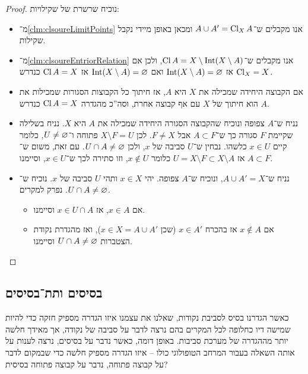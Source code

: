 \documentclass[name=רשימות טופולוגיה כללית]{../../../tex/classes/noChapterMegasumPreamble}
\begin{document}
	\begin{proof}נוכיח שרשרת של שקילויות: 
		\begin{itemize}
			\item[$5\lra3$]מ־\ref{clm:clsoureLimitPoints} אנו מקבלים ש־$A \cup A' = \operatorname{Cl}_X A$ ומכאן באופן מיידי נקבל שקילות. 
			\item[$3\lra4$]מ־\ref{clm:clsoureEntriorRelation} אנו מקבלים ש־$\operatorname{Cl} A = X \setminus \operatorname{Int}(X \setminus A)$, ולכן אם $\operatorname{Cl}_X = X$ אז $\operatorname{Int}(X \setminus A) = \varnothing$ ואם $\operatorname{Int}(X \setminus A) = \varnothing$ אז $\operatorname{Cl} A = X$ כנדרש. 
			\item[$2\to3$]אם הקבוצה היחידה שמכילה את $X$ היא $A$, אז חיתוך כל הקבוצות הסגורות שמכילות את $A$ הוא חיתוך של $X$ עם אף קבוצה אחרת, וסה''כ מהגדרה $\operatorname{Cl} A = X$ כנדרש. 
			\item[$1\to2$]נניח ש־$A$ צפופה ונוכיח שהקבוצה הסגורה היחידה שמכילה את $A$ היא $X$. נניח בשלילה שקיימת $F$ סגורה כך ש־$A \subset F$ אבל $F \neq X$. לכן $X \setminus F = U$ פתוחה ו־$U \neq \varnothing$, כלומר קיים $x \in U$ כלשהו. נבחין ש־$U$ סביבה של $x$, ולכן $U \cap A \neq \varnothing$. עם זאת, משום ש־$A \subset F$ אז $U = X \setminus F \subset X \setminus A$ כלומר $x \notin U$, וזו סתירה לכך ש־$x \in U$, וסיימנו. 
			\item[$5\to1$]נניח ש־$A \cup A' = X$, ונוכיח ש־$A$ צפופה. יהי $x \in X$ ותהי $U$ סביבה של $x$. נוכיח ש־$U \cap A \neq \varnothing$. נפרק למקרים. 
			\begin{itemize}
				\item אם $x \in A$, אז $x \in U \cap A$ וסיימנו. 
				\item אם $x \notin A$ אז בהכרח $x \in A'$ (שכן $x \in X = A \cup A'$), ואז מהגדרת נקודת הצטברות $U \cap A \neq \varnothing$ וסיימנו. \quad\ \ 
			\end{itemize}
		\end{itemize}\envendproof
	\end{proof}
\subsection{\label{ss:bases}בסיסים ותת־בסיסים}
	כאשר הגדרנו בסיס לסביבת נקודות, שאלנו את עצמנו איזו הגדרה מספיק חזקה כדי להיות שמישה דיו כחלופה לכל המקרים בהם נרצה לדבר על סביבה של נקודה, אך מאידך חלשה יותר מההגדרה של מערכת סביבות. באופן דומה, כאשר נדבר על בסיסים, נרצה לענות על אותה השאלה בעבור המרחב הטופולוגי כולו – איזו הגדרה מספיק חלשה כדי שבמקום לדבר על קבוצה פתוחה, נדבר על קבוצה פתוחה בסיסית? 
	
\end{document}
